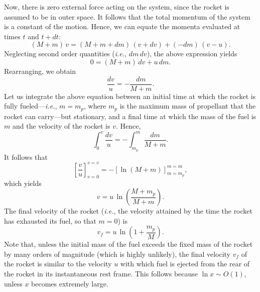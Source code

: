 Now, there is zero external force acting on the system, since the rocket is assumed to be in outer space.
It follows that the total momentum of the system is a constant of the motion. Hence, we
can equate the momenta evaluated at times $t$ and $t+dt$:
\begin{equation}
(M+m)\,v = (M+m+dm)\,(v+dv) + (-dm)\,(v-u).
\end{equation}
Neglecting second order quantities ({\em i.e.}, $dm\,dv$), the above expression
yields
\begin{equation}
0 = (M+m)\,dv + u\,dm.
\end{equation}
Rearranging, we obtain
\begin{equation}
\frac{dv}{u} =- \frac{dm}{M+m}.
\end{equation}
Let us integrate the above equation between an initial time at which the rocket is
fully fueled---{\em i.e.}, $m=m_p$, where $m_p$ is the maximum mass of propellant that the
rocket can carry---but stationary, and a final time at which the mass of the fuel is $m$
and the velocity of the rocket is $v$. Hence,
\begin{equation}
\int_0^v\frac{dv}{u}= -\int_{m_p}^m\frac{dm}{M+m}.
\end{equation}
It follows that
\begin{equation}
\left[\frac{v}{u}\right]_{v=0}^{v=v}= -\left[\ln(M+m)\right]_{m=m_p}^{m=m},
\end{equation} 
which yields
\begin{equation}
v = u\,\ln\left(\frac{M+m_p}{M+m}\right).
\end{equation}
The final velocity of the rocket ({\em i.e.}, the velocity attained by the time
the rocket has exhausted its fuel, so that  $m=0$) is
\begin{equation}
v_f = u\, \ln\left(1+\frac{m_p}{M}\right).
\end{equation}
Note that, unless the initial mass of the fuel  exceeds the fixed mass of the
rocket by many orders of magnitude
(which is highly unlikely), the final velocity $v_f$ of the rocket is similar to
the velocity $u$ with which  fuel is ejected from the rear of the rocket in 
its instantaneous rest frame. This follows because $\ln x \sim O(1)$, unless $x$ becomes
extremely large.

